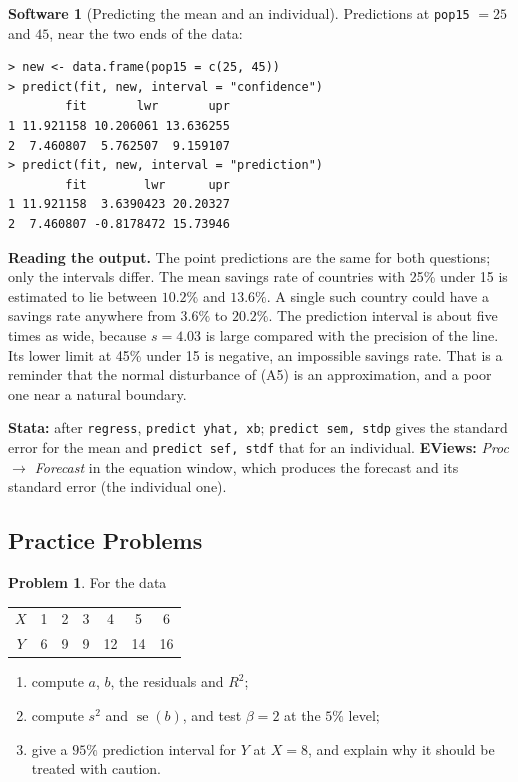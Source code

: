 \documentclass[11pt,a4paper]{article}
\numberwithin{equation}{section}
\theoremstyle{definition}
\newtheorem{software}[thm]{Software}
\newtheorem{problemx}{Problem}[subsection]
\newenvironment{problem}{\begin{problemx}}{\end{problemx}}
\begin{document}
\begin{software}[Predicting the mean and an individual]
\label{sw:predict}
Predictions at \texttt{pop15} $= 25$ and $45$, near the two ends of the data:
{\small\begin{verbatim}
> new <- data.frame(pop15 = c(25, 45))
> predict(fit, new, interval = "confidence")
        fit       lwr       upr
1 11.921158 10.206061 13.636255
2  7.460807  5.762507  9.159107
> predict(fit, new, interval = "prediction")
        fit        lwr      upr
1 11.921158  3.6390423 20.20327
2  7.460807 -0.8178472 15.73946
\end{verbatim}}
\textbf{Reading the output.} The point predictions are the same for both questions; only the intervals differ. The mean savings rate of
countries with 25\% under 15 is estimated to lie between $10.2\%$ and $13.6\%$. A single such country could have a savings rate anywhere from
$3.6\%$ to $20.2\%$. The prediction interval is about five times as wide, because $s = 4.03$ is large compared with the precision of the line. Its
lower limit at 45\% under 15 is negative, an impossible savings rate. That is a reminder that the normal disturbance of (A5) is an approximation,
and a poor one near a natural boundary.

\textbf{Stata:} after \texttt{regress}, \texttt{predict yhat, xb}; \texttt{predict sem, stdp} gives the standard error for the mean and
\texttt{predict sef, stdf} that for an individual. \textbf{EViews:} \emph{Proc $\to$ Forecast} in the equation window, which produces the
forecast and its standard error (the individual one).
\end{software}

\subsection{Practice Problems}

\begin{problem}
For the data
\begin{center}
\begin{tabular}{c|cccccc}
$X$ & 1 & 2 & 3 & 4 & 5 & 6\\
$Y$ & 6 & 9 & 9 & 12 & 14 & 16
\end{tabular}
\end{center}
\begin{enumerate}[label=(\alph*)]
\item compute $a$, $b$, the residuals and $R^2$;
\item compute $s^2$ and $\operatorname{se}(b)$, and test $\beta = 2$ at the $5\%$ level;
\item give a $95\%$ prediction interval for $Y$ at $X = 8$, and explain why it should be treated with caution.
\end{enumerate}
\end{problem}
\end{document}

